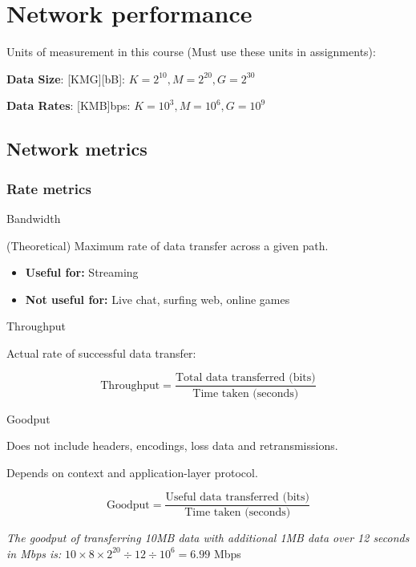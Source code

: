 
\section{Network performance}

Units of measurement in this course (Must use these units in assignments):

\textbf{Data Size}: [KMG][bB]: $K=2^{10}, M=2^{20}, G=2^{30}$

\textbf{Data Rates}: [KMB]bps: $K=10^3, M=10^6, G=10^9$

\subsection{Network metrics}

\subsubsection{Rate metrics}

\begin{knBox}
    {Bandwidth}

    (Theoretical) Maximum rate of data transfer across a given path.

    \begin{itemize}
        \item \textbf{Useful for:} Streaming
        \item \textbf{Not useful for:} Live chat, surfing web, online games
    \end{itemize}
\end{knBox}

\begin{knBox}
    {Throughput}

    Actual rate of successful data transfer:

    \[\text{Throughput} = \frac{\text{Total data transferred (bits)}}{\text{Time taken (seconds)}}\]
\end{knBox}

\begin{knBox}
    {Goodput}

    Does not include headers, encodings, loss data and retransmissions.

    Depends on context and application-layer protocol.

    \[ \text{Goodput} = \frac{\text{Useful data transferred (bits)}}{\text{Time taken (seconds)}} \]

    \tcblower

    \textit{The goodput of transferring 10MB data with additional 1MB data over 12 seconds in Mbps is:} $10 \times 8 \times 2^{20} \div 12 \div 10^6 = 6.99$ Mbps
\end{knBox}

